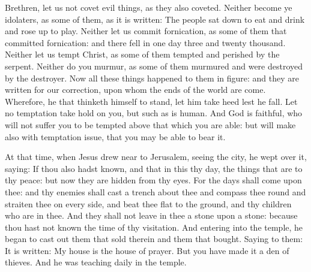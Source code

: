 \begin{multicols}{2}
Brethren, %
let us not covet evil things, as they also coveted.
Neither become ye idolaters, as some of them, as it is written:
The people sat down to eat and drink and rose up to play.
Neither let us commit fornication, as some of them that committed
fornication: and there fell in one day three and twenty thousand.
Neither let us tempt Christ, as some of them tempted and perished
by the serpent.
Neither do you murmur, as some of them murmured and were
destroyed by the destroyer.
Now all these things happened to them in figure: and they are
written for our correction, upon whom the ends of the world are come.
Wherefore, he that thinketh himself to stand, let him take heed
lest he fall.
Let no temptation take hold on you, but such as is human.  And
God is faithful, who will not suffer you to be tempted above that which
you are able: but will make also with temptation issue, that you may be
able to bear it.




At that time, when Jesus drew near to Jerusalem, seeing the city, he wept over it, saying:
If thou also hadst known, and that in this thy day, the things
that are to thy peace: but now they are hidden from thy eyes.
For the days shall come upon thee: and thy enemies shall cast a
trench about thee and compass thee round and straiten thee on every
side,
and beat thee flat to the ground, and thy children who are in
thee. And they shall not leave in thee a stone upon a stone: because
thou hast not known the time of thy visitation.
And entering into the temple, he began to cast out them that sold
therein and them that bought.
Saying to them: It is written: My house is the house of prayer.
But you have made it a den of thieves.
And he was teaching daily in the temple. %



\bigskip






\end{multicols}
